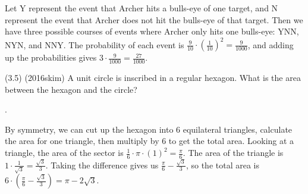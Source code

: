 \documentclass[11pt]{article}
\begin{document}
\begin{solution}
Let Y represent the event that Archer hits a bulls-eye of one target, and N represent the event that Archer does not hit the bulls-eye of that target. Then we have three possible courses of events where Archer only hits one bulls-eye: YNN, NYN, and NNY. The probability of each event is $\frac{9}{10}\cdot(\frac{1}{10})^2 = \frac{9}{1000}$, and adding up the probabilities gives $3\cdot\frac{9}{1000} = \boxed{\frac{27}{1000}}$.
\end{solution}

\begin{problem}
(3.5) (2016skim) A unit circle is inscribed in a regular hexagon. What is the area between the hexagon and the circle?
\end{problem}

\begin{answer}
.
\end{answer}

\begin{solution}
By symmetry, we can cut up the hexagon into 6 equilateral triangles, calculate the area for one triangle, then multiply by 6 to get the total area. Looking at a triangle, the area of the sector is $\frac{1}{6}\cdot\pi\cdot(1)^2 = \frac{\pi}{6}$. The area of the triangle is $1\cdot\frac{1}{\sqrt{3}} = \frac{\sqrt{3}}{3}$. Taking the difference gives us $\frac{\pi}{6} - \frac{\sqrt{3}}{3}$, so the total area is $6\cdot(\frac{\pi}{6} - \frac{\sqrt{3}}{3}) = \boxed{\pi - 2\sqrt{3}}$.
\end{solution}
\end{document}
